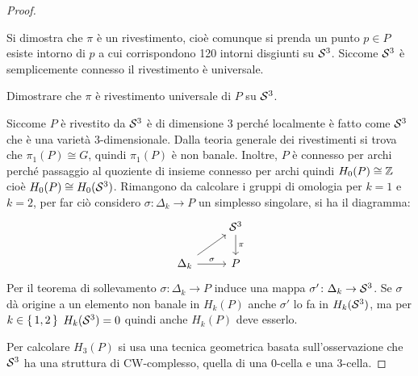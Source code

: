 \begin{proof}
\begin{enumerate}
  \end{enumerate}
  Si dimostra che $ \pi $ è un rivestimento, cioè comunque si prenda un punto $ p \in P $
  esiste intorno di $ p $ a cui corrispondono 120 intorni disgiunti su $ \mathcal{S}^{3} $.
  Siccome $ \mathcal{S}^{3} $ è semplicemente connesso il rivestimento è universale.
  \begin{exercise}
    Dimostrare che $ \pi $ è rivestimento universale di $ P $ su $ \mathcal{S}^{3} $.
  \end{exercise}
  Siccome $ P $ è rivestito da $ \mathcal{S}^{3} $ è di dimensione 3 perché localmente è
  fatto come $ \mathcal{S}^{3} $ che è una varietà $ 3 $-dimensionale. Dalla teoria
  generale dei rivestimenti si trova che $ \pi_1(P) \cong G $, quindi
  $ \pi_1(P) $ è non banale. Inoltre, $ P $ è connesso per archi perché passaggio
  al quoziente di insieme connesso per archi quindi $ H_0(P) \cong \mathbb{Z} $ cioè
  $ H_0(P) \cong H_0(\mathcal{S}^{3}) $. Rimangono da calcolare i gruppi di omologia per
  $ k = 1 $ e $ k = 2 $, per far ciò considero $ \sigma \colon \Delta_k \to P $ un simplesso
  singolare, si ha il diagramma:
  \[
    \begin{tikzcd}
      {} & \Sph{3} \dar{\pi} \\
      \Delta_k \rar{\sigma} \arrow{ru}{} & P
    \end{tikzcd}
  \]
  Per il teorema di sollevamento $ \sigma \colon \Delta_k \to P $ induce una mappa
  $ \sigma' \colon \Delta_k \to \mathcal{S}^{3} $. Se $ \sigma $ dà origine a un elemento non banale in
  $ H_k(P) $ anche $ \sigma' $ lo fa in $ H_k(\mathcal{S}^{3}) $, ma per $ k \in \set{1,2} $
  $ H_k(\mathcal{S}^{3}) = 0 $ quindi anche $ H_k(P) $ deve esserlo.


  Per calcolare $ H_3(P) $ si usa una tecnica geometrica basata
  sull'osservazione che $ \mathcal{S}^{3} $ ha una struttura di CW-complesso, quella di
  una $ 0 $-cella e una $ 3 $-cella.


\end{proof}
